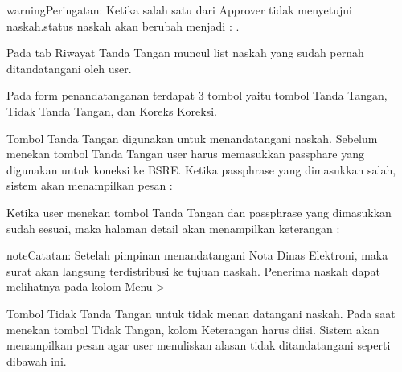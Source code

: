 \documentclass[letterpaper,10pt,bahasai]{sphinxmanual}
\begin{document}
\begin{sphinxadmonition}{warning}{Peringatan:}
Ketika salah satu dari Approver tidak menyetujui naskah.status naskah akan berubah menjadi : .
\end{sphinxadmonition}

\noindent{}

Pada tab Riwayat Tanda Tangan muncul list naskah yang sudah pernah ditandatangani oleh user.

\noindent{}

Pada form penandatanganan terdapat 3 tombol yaitu tombol Tanda Tangan, Tidak Tanda Tangan, dan Koreks Koreksi.

\begin{DUlineblock}{0em}
\item[]  Tombol Tanda Tangan digunakan untuk menandatangani naskah. Sebelum menekan tombol Tanda Tangan user harus memasukkan passphare yang digunakan untuk koneksi ke BSRE. Ketika passphrase yang dimasukkan salah, sistem akan menampilkan pesan : 
\end{DUlineblock}

\noindent{}

\begin{DUlineblock}{0em}
\item[]  Ketika user menekan tombol Tanda Tangan dan passphrase yang dimasukkan sudah sesuai, maka halaman detail akan menampilkan keterangan : 
\end{DUlineblock}

\noindent{}

\begin{sphinxadmonition}{note}{Catatan:}
Setelah pimpinan menandatangani Nota Dinas Elektroni, maka surat akan langsung terdistribusi ke tujuan naskah. Penerima naskah dapat melihatnya pada kolom Menu  \sphinxhyphen{}\textgreater{} 
\end{sphinxadmonition}

\begin{DUlineblock}{0em}
\item[]  Tombol Tidak Tanda Tangan untuk tidak menan datangani naskah. Pada saat menekan tombol Tidak Tangan, kolom Keterangan harus diisi. Sistem akan menampilkan pesan agar user menuliskan alasan tidak ditandatangani seperti dibawah ini.
\end{DUlineblock}
\end{document}
